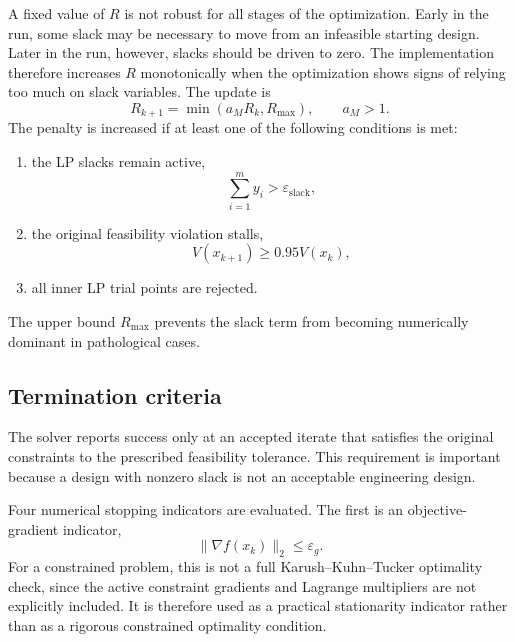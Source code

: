 \documentclass[11pt,a4paper]{article}
\begin{document}
A fixed value of $R$ is not robust for all stages of the optimization.
Early in the run, some slack may be necessary to move from an
infeasible starting design. Later in the run, however, slacks should
be driven to zero. The implementation therefore increases $R$
monotonically when the optimization shows signs of relying too much
on slack variables. The update is
\begin{equation}
\label{eq:appA_penalty}
    R_{k+1}
    =
    \min\left(a_M R_k, R_{\max}\right),
    \qquad
    a_M>1 .
\end{equation}
The penalty is increased if at least one of the following conditions
is met:
\begin{enumerate}[label=(\roman*)]
    \item the LP slacks remain active,
    \begin{equation}
    \label{eq:appA_slack_active}
        \sum_{i=1}^m y_i > \varepsilon_{\mathrm{slack}},
    \end{equation}

    \item the original feasibility violation stalls,
    \begin{equation}
    \label{eq:appA_feas_stall}
        V(x_{k+1}) \geq 0.95 V(x_k),
    \end{equation}

    \item all inner LP trial points are rejected.
\end{enumerate}
The upper bound $R_{\max}$ prevents the slack term from becoming
numerically dominant in pathological cases.

\subsection{Termination criteria}
\label{sec:slpA:termination}

The solver reports success only at an accepted iterate that satisfies
the original constraints to the prescribed feasibility tolerance.
This requirement is important because a design with nonzero slack is
not an acceptable engineering design.

Four numerical stopping indicators are evaluated. The first is an
objective-gradient indicator,
\begin{equation}
\label{eq:appA_stop_grad}
    \|\nabla f(x_k)\|_2
    \leq
    \varepsilon_g .
\end{equation}
For a constrained problem, this is not a full Karush--Kuhn--Tucker
optimality check, since the active constraint gradients and Lagrange
multipliers are not explicitly included. It is therefore used as a
practical stationarity indicator rather than as a rigorous constrained
optimality condition.
\end{document}
